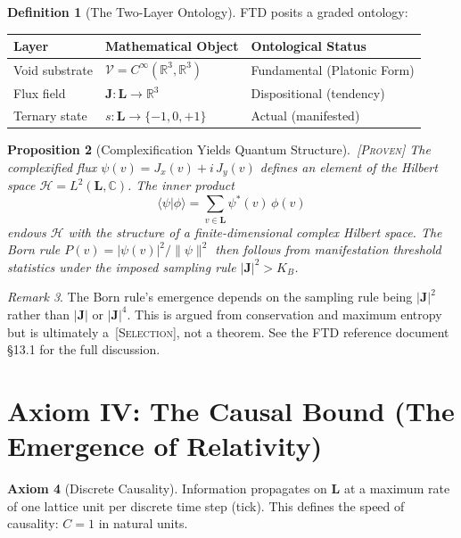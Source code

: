 \documentclass[11pt,twoside]{article}
\theoremstyle{definition}
\newtheorem{axiom}{Axiom}
\newtheorem{definition}[axiom]{Definition}
\theoremstyle{plain}
\newtheorem{proposition}[axiom]{Proposition}
\theoremstyle{remark}
\newtheorem{remark}[axiom]{Remark}
\newcommand{\etag}[1]{\,\textnormal{\textsc{\footnotesize[#1]}}}
\newcommand{\proven}{\etag{Proven}}
\newcommand{\selection}{\etag{Selection}}
\newcommand{\Void}{\mathcal{V}}
\newcommand{\Lattice}{\mathbf{L}}
\newcommand{\Real}{\mathbb{R}}
\newcommand{\Complex}{\mathbb{C}}
\newcommand{\Hilbert}{\mathcal{H}}
\begin{document}
\begin{definition}[The Two-Layer Ontology]\label{def:layers}
FTD posits a graded ontology:
\begin{center}
\begin{tabular}{lll}
    \toprule
    \textbf{Layer} & \textbf{Mathematical Object} & \textbf{Ontological Status} \\
    \midrule
    Void substrate & $\Void = C^\infty(\Real^3, \Real^3)$ & Fundamental (Platonic Form) \\
    Flux field & $\mathbf{J}: \Lattice \to \Real^3$ & Dispositional (tendency) \\
    Ternary state & $s: \Lattice \to \{-1, 0, +1\}$ & Actual (manifested) \\
    \bottomrule
\end{tabular}
\end{center}
\end{definition}

\begin{proposition}[Complexification Yields Quantum Structure]\label{prop:complex}\proven
The complexified flux $\psi(v) = J_x(v) + i\,J_y(v)$ defines an element of the Hilbert space $\Hilbert = L^2(\Lattice, \Complex)$. The inner product
\begin{equation}
    \langle \psi | \phi \rangle = \sum_{v \in \Lattice} \psi^*(v)\,\phi(v)
\end{equation}
endows $\Hilbert$ with the structure of a finite-dimensional complex Hilbert space. The Born rule $P(v) = |\psi(v)|^2 / \|\psi\|^2$ then follows from manifestation threshold statistics under the imposed sampling rule $|\mathbf{J}|^2 > K_B$.
\end{proposition}

\begin{remark}
The Born rule's emergence depends on the sampling rule being $|\mathbf{J}|^2$ rather than $|\mathbf{J}|$ or $|\mathbf{J}|^4$. This is argued from conservation and maximum entropy but is ultimately a \selection{}, not a theorem. See the FTD reference document \S13.1 for the full discussion.
\end{remark}

\section{Axiom IV: The Causal Bound (The Emergence of Relativity)}

\begin{axiom}[Discrete Causality]\label{ax:causality}
Information propagates on $\Lattice$ at a maximum rate of one lattice unit per discrete time step (tick). This defines the speed of causality: $C = 1$ in natural units.
\end{axiom}
\end{document}
